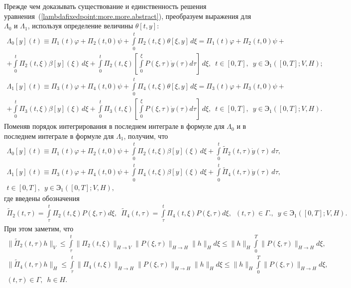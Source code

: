 \documentclass{report}
\begin{document}
Прежде чем доказывать существование и единственность решения уравнения~({\ref{lambdafixedpoint:more.more.abstract}}), преобразуем выражения для $\Lambda_0$ и  $\Lambda_1$, используя
определение величины $\theta[t,y]$:
\begin{gather*}
\Lambda_0[y](t)\equiv\Pi_1(t)\varphi+\Pi_2(t,0)\psi+ \int\limits_{0}^{t}\Pi_2(t,\xi)\theta[\xi,y]\,d\xi=\Pi_1(t)\varphi+\Pi_2(t,0)\psi+\\
+ \int\limits_{0}^{t}\Pi_2(t,\xi)\beta[y](\xi)\,d\xi+\int\limits_{0}^{t}\Pi_2(t,\xi)\left[\int\limits_0^\xi P(\xi,\tau)\dot{y}(\tau)d\tau\right]\,d\xi,\,\,\,
t\in[0,T],\,\,\,y\in{\textbf{Э}}_1([0,T];V,H);\\
\Lambda_1[y](t)\equiv\Pi_3(t)\varphi+\Pi_4(t,0)\psi+ \int\limits_{0}^{t}\Pi_4(t,\xi)\theta[\xi,y]\,d\xi=\Pi_3(t)\varphi+\Pi_3(t,0)\psi+\\
+\int\limits_{0}^{t}\Pi_3(t,\xi)\beta[y](\xi)\,d\xi+\int\limits_{0}^{t}\Pi_3(t,\xi)\left[\int\limits_0^\xi P(\xi,\tau)\dot{y}(\tau)d\tau\right]\,d\xi,\,\,\,
t\in[0,T],\,\,\,y\in{\textbf{Э}}_1([0,T];V,H).
\end{gather*}
Поменяв порядок интегрирования в последнем интеграле в формуле для $\Lambda_0$ и в последнем интеграле в формуле для $\Lambda_1$, получим, что
\begin{gather*}
\Lambda_0[y](t)\equiv\Pi_1(t)\varphi+\Pi_2(t,0)\psi+\int\limits_{0}^{t}\Pi_2(t,\xi)\beta[y](\xi)\,d\xi+\int\limits_{0}^{t}\tilde{\Pi}_2(t,\tau)\dot{y}(\tau)\,d\tau,\\
\Lambda_1[y](t)\equiv\Pi_3(t)\varphi+\Pi_4(t,0)\psi+\int\limits_{0}^{t}\Pi_4(t,\xi)\beta[y](\xi)\,d\xi+\int\limits_{0}^{t}\tilde{\Pi}_4(t,\tau)\dot{y}(\tau)\,d\tau,\\
t\in[0,T],\,\,\,y\in{\textbf{Э}}_1([0,T];V,H),
\end{gather*}
где введены обозначения
\begin{gather*}
\tilde{\Pi}_2(t,\tau)=\int\limits_\tau^t\Pi_2(t,\xi)P(\xi,\tau)d\xi,\,\,\,\tilde{\Pi}_4(t,\tau)=\int\limits_\tau^t\Pi_4(t,\xi)P(\xi,\tau)d\xi,\,\,\,(t,\tau)\in\Gamma.
,\,\,\,y\in{\textbf{Э}}_1([0,T];V,H).
\end{gather*}
При этом заметим, что
\begin{gather*}
\|\tilde{\Pi}_2(t,\tau)h\|_V\leqslant\int\limits_\tau^t\|\Pi_2(t,\xi)\|_{H\to V}\|P(\xi,\tau)\|_{H\to H}\|h\|_Hd\xi\leqslant\|h\|_H\int\limits_0^T\|P(\xi,\tau)\|_{H\to H}d\xi,\\
\|\tilde{\Pi}_4(t,\tau)h\|_H\leqslant\int\limits_\tau^t\|\Pi_4(t,\xi)\|_{H\to H}\|P(\xi,\tau)\|_{H\to H}\|h\|_Hd\xi\leqslant\|h\|_H\int\limits_0^T\|P(\xi,\tau)\|_{H\to H}d\xi,\\
(t,\tau)\in\Gamma,\,\,\,h\in H.
\end{gather*}
\end{document}
